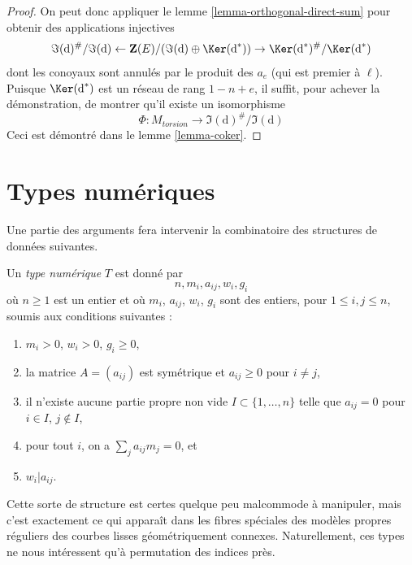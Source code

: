 \begin{proof}
\medskip\noindent
On peut donc appliquer le lemme \ref{lemma-orthogonal-direct-sum}
pour obtenir des applications injectives
$$
\Im(\text{d})^\#/\Im(\text{d}) \leftarrow
\mathbf{Z}(E)/(\Im(\text{d}) \oplus \Ker(\text{d}^*)) \rightarrow
\Ker(\text{d}^*)^\#/\Ker(\text{d}^*)
$$
dont les conoyaux sont annulés par le produit des $a_e$
(qui est premier à $\ell$). Puisque $\Ker(\text{d}^*)$ est
un réseau de rang $1 - n + e$, il suffit, pour achever la démonstration,
de montrer qu'il existe un isomorphisme
$$
\Phi : M_{torsion} \longrightarrow \Im(\text{d})^\#/\Im(\text{d})
$$
Ceci est démontré dans le lemme \ref{lemma-coker}.
\end{proof}









\section{Types numériques}
\label{section-numerical-types}

\noindent
Une partie des arguments fera intervenir la combinatoire des structures
de données suivantes.

\begin{definition}
\label{definition-type}
Un {\it type numérique} $T$ est donné par
$$
n, m_i, a_{ij}, w_i, g_i
$$
où $n \geq 1$ est un entier et où $m_i$, $a_{ij}$, $w_i$, $g_i$
sont des entiers, pour $1 \leq i, j \leq n$, soumis aux conditions suivantes :
\begin{enumerate}
\item $m_i > 0$, $w_i > 0$, $g_i \geq 0$,
\item la matrice $A = (a_{ij})$ est symétrique et $a_{ij} \geq 0$
pour $i \not = j$,
\item il n'existe aucune partie propre non vide $I \subset \{1, \ldots, n\}$
telle que $a_{ij} = 0$ pour $i \in I$, $j \not \in I$,
\item pour tout $i$, on a $\sum_j a_{ij}m_j = 0$, et
\item $w_i | a_{ij}$.
\end{enumerate}
\end{definition}

\noindent
Cette sorte de structure est certes quelque peu malcommode à manipuler,
mais c'est exactement ce qui apparaît dans les fibres spéciales des modèles
propres réguliers des courbes lisses géométriquement connexes.
Naturellement, ces types ne nous intéressent qu'à permutation des indices près.

